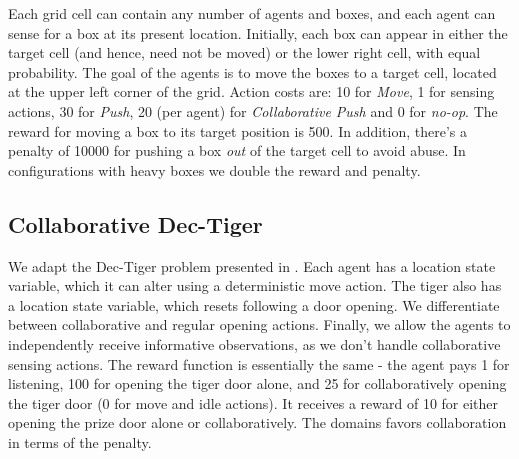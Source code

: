 \documentclass[letterpaper]{article}
\theoremstyle{definition}
\newcommand{\cdt}[0]{Collaborative Dec-Tiger}
\begin{document}
Each grid cell can contain any number of agents and boxes, and each agent can sense for a box at its present location.
Initially, each box can appear in either the target cell (and hence, need not be moved) or the lower right cell, with equal probability.
The goal of the agents is to move the boxes to a target cell, located at the upper left corner of the grid.
Action costs are: 10 for {\em Move}, 1
for sensing actions, 30 for {\em Push}, 20 (per agent) 
for {\em Collaborative Push} and 0 for {\em no-op}. The reward for moving a box to its target position is 500. In addition, there's a penalty of 10000 for pushing a box \emph{out} of the target cell to avoid abuse. In configurations with heavy boxes we double the reward and penalty.


\subsection{\cdt}
We adapt the Dec-Tiger problem presented in \cite{JESP}. Each agent has a location state variable, which it can alter using a deterministic move action. The tiger also has a location state variable, which resets following a door opening. We differentiate between collaborative and regular opening actions. Finally, we allow the agents to independently receive informative observations, as we don't handle collaborative sensing actions. The reward function is essentially the same - the agent pays 1 for listening, 100 for opening the tiger door alone, and 25 for collaboratively opening the tiger door (0 for move and idle actions). It receives a reward of 10 for either opening the prize door alone or collaboratively. The domains favors collaboration in terms of the penalty.
\end{document}
